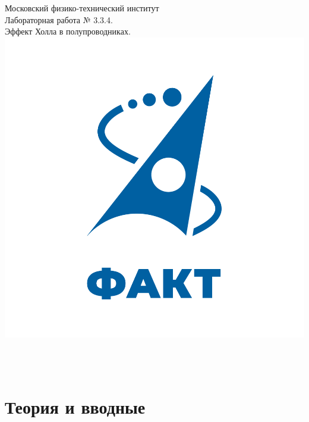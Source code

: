 \documentclass[a4paper,12pt]{article} %
\begin{document}

\begin{titlepage}
\begin{center}
	\large{Московский физико-технический институт}\\
	\vspace{100px}
	\LARGE{Лабораторная работа № 3.3.4.}\\
	\LARGE{Эффект Холла в полупроводниках.}\\
	\vspace{30px}
	\includegraphics[scale = 0.3]{fakt_logo.png}\\
\end{center}

\vfill
\begin{flushright}
	\\
	\\
\end{flushright}
\end{titlepage}

\newpage

\tableofcontents

\newpage

\section{Теория и вводные}
\end{document}
